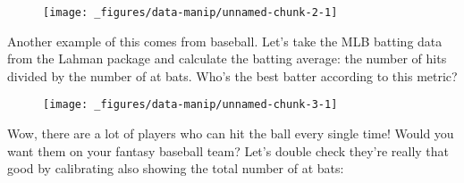 \begin{figure}[H]
  \centering
  \texttt{[image: \_figures/data-manip/unnamed-chunk-2-1]}
\end{figure}

Another example of this comes from baseball. Let's take the MLB batting
data from the Lahman package and calculate the batting average: the
number of hits divided by the number of at bats. Who's the best batter
according to this metric?

\begin{Shaded}
\begin{Highlighting}[]
 \NormalTok{)}
\StringTok{ }\StringTok{ }\NormalTok{)}
\StringTok{ }
\StringTok{ }
    \NormalTok{) /}\StringTok{ } \NormalTok{)}
\NormalTok{)}
\StringTok{ }
\StringTok{  }\NormalTok{(} \NormalTok{)}
\end{Highlighting}
\end{Shaded}

\begin{figure}[H]
  \centering
  \texttt{[image: \_figures/data-manip/unnamed-chunk-3-1]}
\end{figure}

Wow, there are a lot of players who can hit the ball every single time!
Would you want them on your fantasy baseball team? Let's double check
they're really that good by calibrating also showing the total number of
at bats:

\begin{Shaded}
\begin{Highlighting}[]
\StringTok{ }
    \NormalTok{) /}\StringTok{ } \NormalTok{),}
    \NormalTok{)}
\NormalTok{)}
\StringTok{ }
\StringTok{  }\NormalTok{(} \NormalTok{) +}\StringTok{ }
\StringTok{  }\NormalTok{()}


\end{Highlighting}
\end{Shaded}

